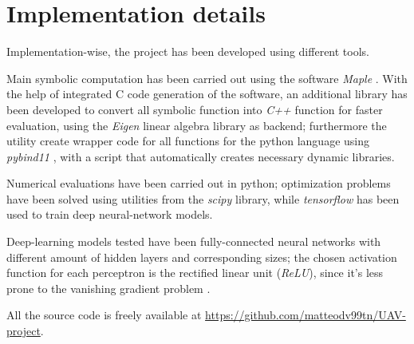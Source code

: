 \section{Implementation details} \label{sec:code}
Implementation-wise, the project has been developed using different tools.

Main symbolic computation has been carried out using the software \textit{Maple} \cite{maple}. With the help of integrated C code generation of the software, an additional library has been developed to convert all symbolic function into \textit{C++} function for faster evaluation, using the \textit{Eigen} \cite{eigen} linear algebra library as backend; furthermore the utility create wrapper code for all functions for the python language using \textit{pybind11} \cite{pybind11}, with a script that automatically creates necessary dynamic libraries.

Numerical evaluations have been carried out in python; optimization problems have been solved using utilities from the \textit{scipy} \cite{scipy} library, while \textit{tensorflow} \cite{tensorflow} has been used to train deep neural-network models.

Deep-learning models tested have been fully-connected neural networks with different amount of hidden layers and corresponding sizes; the chosen activation function for each perceptron is the rectified linear unit (\textit{ReLU}), since it's less prone to the vanishing gradient problem \cite{vanishing}.

All the source code is freely available at \url{https://github.com/matteodv99tn/UAV-project}.
